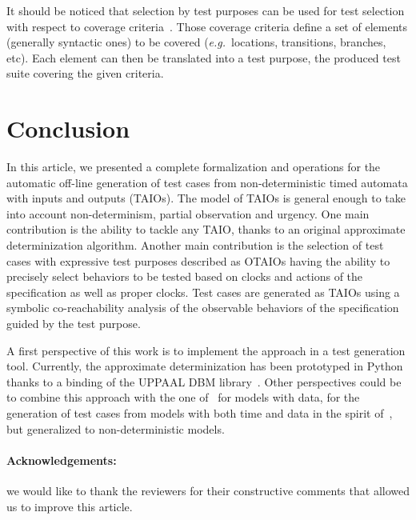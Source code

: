 \documentclass{LMCS}
\theoremstyle{plain}\newtheorem{proposition}[thm]{Proposition}
\def\eg{{\em e.g.}}
\begin{document}
It should be noticed that selection by test purposes can be used for 
test selection with respect to coverage criteria~\cite{Zhu-Hall-May-97}.
Those coverage criteria define a set of  elements (generally syntactic ones) 
to be covered (\eg~locations, transitions, branches, etc). 
Each element can then be translated into a test purpose, 
the produced test suite covering the given criteria.


\section{Conclusion}
\label{sec-conclusion}


In this article, we presented a complete formalization and operations
for the automatic off-line generation of test cases from
non-deterministic timed automata with inputs and outputs (TAIOs).  The
model of TAIOs is general enough to take into account non-determinism,
partial observation and urgency.  One main contribution is the ability
to tackle any TAIO, thanks to an original approximate determinization
algorithm.  Another main contribution is the selection of test cases
with expressive test purposes described as OTAIOs having the ability
to precisely select behaviors to be tested based on clocks and actions
of the specification as well as proper clocks.  Test cases are
generated as TAIOs using a symbolic co-reachability analysis of the
observable behaviors of the specification guided by the test purpose.

A first perspective of this work is to implement the approach in a
test generation tool.  Currently, the approximate determinization has
been prototyped in Python thanks to a binding of the UPPAAL DBM
library~\cite{uppaal-dbm}.  Other perspectives could be to combine
this approach with the one of~\cite{jeannet05a} for models with data,
for the generation of test cases from models with both time and data
in the spirit of~\cite{amost}, but generalized to non-deterministic
models.


\paragraph{Acknowledgements:} we would like to thank the reviewers for their constructive comments 
that allowed us to improve this article.




\end{document}
